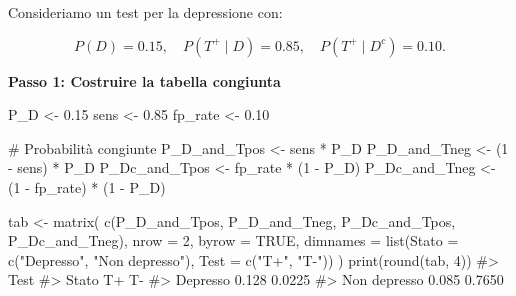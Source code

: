 \documentclass[
  italian,
  letterpaper,
  a4paper,
  11pt,
  open=any]{scrbook}
\newenvironment{Shaded}{\begin{snugshade}}{\end{snugshade}}
\newcommand{\AttributeTok}[1]{\textcolor[rgb]{0.40,0.45,0.13}{#1}}
\newcommand{\CommentTok}[1]{\textcolor[rgb]{0.37,0.37,0.37}{#1}}
\newcommand{\ConstantTok}[1]{\textcolor[rgb]{0.56,0.35,0.01}{#1}}
\newcommand{\DecValTok}[1]{\textcolor[rgb]{0.68,0.00,0.00}{#1}}
\newcommand{\FloatTok}[1]{\textcolor[rgb]{0.68,0.00,0.00}{#1}}
\newcommand{\FunctionTok}[1]{\textcolor[rgb]{0.28,0.35,0.67}{#1}}
\newcommand{\NormalTok}[1]{\textcolor[rgb]{0.00,0.23,0.31}{#1}}
\newcommand{\OtherTok}[1]{\textcolor[rgb]{0.00,0.23,0.31}{#1}}
\newcommand{\SpecialCharTok}[1]{\textcolor[rgb]{0.37,0.37,0.37}{#1}}
\newcommand{\StringTok}[1]{\textcolor[rgb]{0.13,0.47,0.30}{#1}}
\theoremstyle{plain}
\theoremstyle{definition}
\theoremstyle{definition}
\theoremstyle{remark}
\begin{document}
\begin{tcolorbox}[enhanced jigsaw, arc=.35mm, bottomrule=.15mm, bottomtitle=1mm, breakable, colback=white, colbacktitle=quarto-callout-note-color!10!white, colframe=quarto-callout-note-color-frame, coltitle=black, left=2mm, leftrule=.75mm, opacityback=0, opacitybacktitle=0.6, rightrule=.15mm, title=\textcolor{quarto-callout-note-color}{\faInfo}\hspace{0.5em}{Esempio: costruzione esplicita di una tabella diagnostica}, titlerule=0mm, toprule=.15mm, toptitle=1mm]

Consideriamo un test per la depressione con:

\[
P(D)=0.15,\quad
P(T^+ \mid D)=0.85,\quad
P(T^+ \mid D^c)=0.10.
\]

\textbf{Passo 1: Costruire la tabella congiunta}

\begin{Shaded}
\begin{Highlighting}[]
\NormalTok{P\_D }\OtherTok{\textless{}{-}} \FloatTok{0.15}
\NormalTok{sens }\OtherTok{\textless{}{-}} \FloatTok{0.85}
\NormalTok{fp\_rate }\OtherTok{\textless{}{-}} \FloatTok{0.10}

\CommentTok{\# Probabilità congiunte}
\NormalTok{P\_D\_and\_Tpos  }\OtherTok{\textless{}{-}}\NormalTok{ sens }\SpecialCharTok{*}\NormalTok{ P\_D}
\NormalTok{P\_D\_and\_Tneg  }\OtherTok{\textless{}{-}}\NormalTok{ (}\DecValTok{1} \SpecialCharTok{{-}}\NormalTok{ sens) }\SpecialCharTok{*}\NormalTok{ P\_D}
\NormalTok{P\_Dc\_and\_Tpos }\OtherTok{\textless{}{-}}\NormalTok{ fp\_rate }\SpecialCharTok{*}\NormalTok{ (}\DecValTok{1} \SpecialCharTok{{-}}\NormalTok{ P\_D)}
\NormalTok{P\_Dc\_and\_Tneg }\OtherTok{\textless{}{-}}\NormalTok{ (}\DecValTok{1} \SpecialCharTok{{-}}\NormalTok{ fp\_rate) }\SpecialCharTok{*}\NormalTok{ (}\DecValTok{1} \SpecialCharTok{{-}}\NormalTok{ P\_D)}

\NormalTok{tab }\OtherTok{\textless{}{-}} \FunctionTok{matrix}\NormalTok{(}
  \FunctionTok{c}\NormalTok{(P\_D\_and\_Tpos, P\_D\_and\_Tneg,}
\NormalTok{    P\_Dc\_and\_Tpos, P\_Dc\_and\_Tneg),}
  \AttributeTok{nrow =} \DecValTok{2}\NormalTok{, }\AttributeTok{byrow =} \ConstantTok{TRUE}\NormalTok{,}
  \AttributeTok{dimnames =} \FunctionTok{list}\NormalTok{(}\AttributeTok{Stato =} \FunctionTok{c}\NormalTok{(}\StringTok{"Depresso"}\NormalTok{, }\StringTok{"Non depresso"}\NormalTok{),}
                  \AttributeTok{Test  =} \FunctionTok{c}\NormalTok{(}\StringTok{"T+"}\NormalTok{, }\StringTok{"T{-}"}\NormalTok{))}
\NormalTok{)}
\FunctionTok{print}\NormalTok{(}\FunctionTok{round}\NormalTok{(tab, }\DecValTok{4}\NormalTok{))}
\CommentTok{\#\textgreater{}               Test}
\CommentTok{\#\textgreater{} Stato             T+     T{-}}
\CommentTok{\#\textgreater{}   Depresso     0.128 0.0225}
\CommentTok{\#\textgreater{}   Non depresso 0.085 0.7650}
\end{Highlighting}
\end{Shaded}


\end{tcolorbox}
\end{document}

